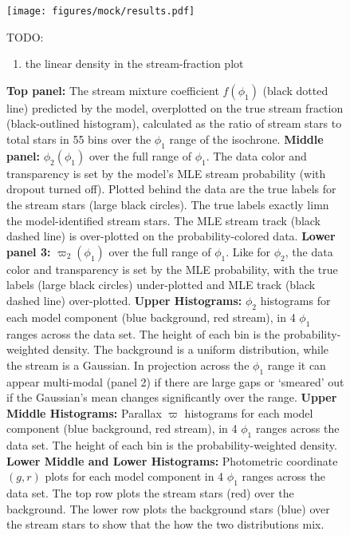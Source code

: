 \documentclass[twocolumn]{aastex631}
\begin{document}
    \begin{figure}
        \centering
        \texttt{[image: figures/mock/results.pdf]}
        \caption{
            \textbf{Top panel:}%
                The stream mixture coefficient $f(\phi_1)$ (black dotted line) predicted by the model, overplotted on the true stream fraction (black-outlined histogram),
                calculated as the ratio of stream stars to total stars in 55 bins
                over the $\phi_1$ range of the isochrone.
            \textbf{Middle panel: }%
                $\phi_2(\phi_1)$ over the full range of $\phi_1$. The data color and transparency is set by the model's MLE stream probability (with dropout turned off). Plotted behind the data are the true labels for the stream stars (large black circles).
                The true labels exactly limn the model-identified stream stars.
                The MLE stream track (black dashed line) is over-plotted on the probability-colored data.
            \textbf{Lower panel 3: }%
                $\varpi_2(\phi_1)$ over the full range of $\phi_1$. Like for $\phi_2$, the data color and transparency is set by the MLE probability, with the true labels (large black circles) under-plotted and MLE track (black dashed line) over-plotted.
            \textbf{Upper Histograms: }%
                $\phi_2$ histograms for each model component (blue background, red stream), in 4 $\phi_1$ ranges across the data set.
                The height of each bin is the probability-weighted density.
                The background is a uniform distribution, while the stream is a Gaussian. In projection across the $\phi_1$ range it can appear multi-modal (panel 2) if there are large gaps or `smeared' out if the Gaussian's mean changes significantly over the range.
            \textbf{Upper Middle Histograms: }%
                Parallax $\varpi$ histograms for each model component (blue background, red stream), in 4 $\phi_1$ ranges across the data set.
                The height of each bin is the probability-weighted density.
            \textbf{Lower Middle and Lower Histograms:}%
                Photometric coordinate $(g, r)$ plots for each model component in 4 $\phi_1$ ranges across the data set. The top row plots the stream stars (red) over the background. The lower row plots the background stars (blue) over the stream stars to show that the
                how the two distributions mix.
        }
        TODO:
        \begin{enumerate}
            \item the linear density in the stream-fraction plot
        \end{enumerate}
        \label{fig:mock_data_result}
    \end{figure}
\end{document}

